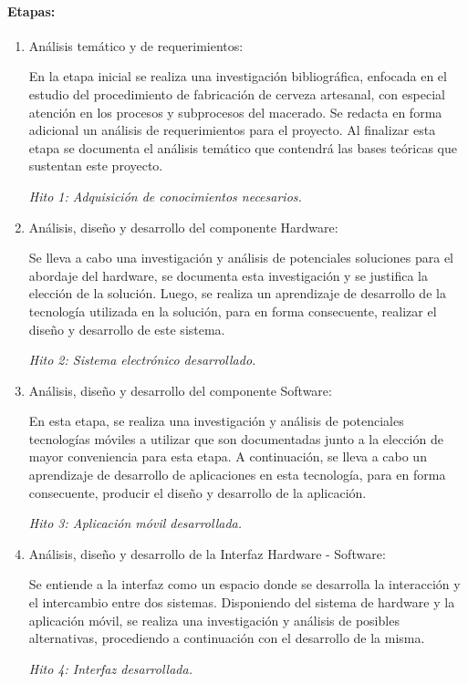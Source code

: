    \paragraph{Etapas:}
        \begin{enumerate}
            \item Análisis temático y de requerimientos:
                \par En la etapa inicial se realiza una investigación bibliográfica, enfocada en el estudio del procedimiento de fabricación de cerveza artesanal, con especial atención en los procesos y subprocesos del macerado. Se redacta en forma adicional un análisis de requerimientos para el proyecto. Al finalizar esta etapa se documenta el análisis temático que contendrá las bases teóricas que sustentan este proyecto.
                \par \textit{Hito 1: Adquisición de conocimientos necesarios.}
                
            \item Análisis, diseño y desarrollo del componente Hardware:
                \par Se lleva a cabo una investigación y análisis de potenciales soluciones para el abordaje del hardware, se  documenta esta investigación y se justifica la elección de la solución. Luego, se realiza un aprendizaje de desarrollo de la tecnología utilizada en la solución, para en forma consecuente, realizar el diseño y desarrollo de este sistema.
                \par \textit{Hito 2: Sistema electrónico desarrollado.} 
                
            \item Análisis, diseño y desarrollo del componente Software:
                \par En esta etapa, se realiza una investigación y análisis de potenciales tecnologías móviles a utilizar que son documentadas junto a la elección de mayor conveniencia para esta etapa. A continuación, se lleva a cabo un aprendizaje de desarrollo de aplicaciones en esta tecnología, para en forma consecuente, producir el diseño y desarrollo de la aplicación.
                \par \textit{Hito 3: Aplicación móvil desarrollada.}
                
            \item Análisis, diseño y desarrollo de la Interfaz Hardware - Software:
                \par Se entiende a la interfaz como un espacio donde se desarrolla la interacción y el intercambio entre dos sistemas. Disponiendo del sistema de hardware y la aplicación móvil, se realiza una investigación y análisis de posibles alternativas, procediendo a continuación con el desarrollo de la misma.
                \par \textit{Hito 4: Interfaz desarrollada.}
                

\end{enumerate}
